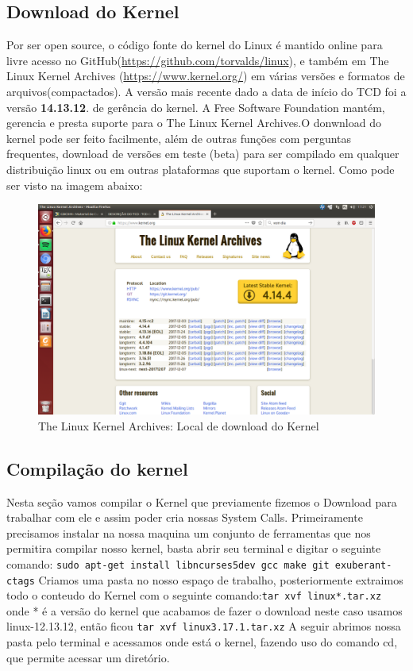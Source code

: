 \documentclass[12pt]{article}
\begin{document}
\subsection*{Download do Kernel}
Por ser open source, o código fonte do kernel do Linux é mantido online para livre acesso no GitHub(\url{https://github.com/torvalds/linux}), e também em The Linux Kernel Archives (\url{https://www.kernel.org/}) em várias versões e formatos de arquivos(compactados). A versão mais recente dado a data de início do TCD foi a versão \textbf{14.13.12}.
de gerência do kernel.
	A Free Software Foundation mantém, gerencia e presta suporte para o The Linux Kernel Archives.O donwnload do kernel pode ser feito facilmente, além de outras funções com perguntas frequentes, download de versões em teste (beta) para ser compilado em qualquer distribuição linux ou em outras plataformas que suportam o kernel.
	\vspace*{2cm}
	 Como pode ser visto na imagem abaixo:
\begin{figure}[!h]
	\centering
	\includegraphics[scale=0.2]{imagens/kernelorg.png}
	\caption{The Linux Kernel Archives: Local de download do Kernel}
	\label{kernelorg}
\end{figure}

\subsection*{Compilação do kernel}
	Nesta seção vamos compilar o Kernel que previamente fizemos o Download para trabalhar com ele e assim poder cria nossas System Calls.
	Primeiramente precisamos instalar na nossa maquina um conjunto de ferramentas que nos permitira compilar nosso kernel, basta abrir seu terminal e digitar o seguinte comando:\newline
	\verb!sudo apt-­get install libncurses5­dev gcc make git exuberant­ctags! 
	Criamos uma pasta no nosso espaço de trabalho, posteriormente extraimos todo o conteudo do Kernel com o seguinte comando:\newline \verb!tar xvf linux­­*.tar.xz! \newline onde * é a versão do kernel que acabamos de fazer o download neste caso usamos linux-12.13.12, então ficou\newline
	\verb!tar xvf linux­3.17.1.tar.xz!\newline
	A seguir abrimos nossa pasta pelo terminal e acessamos onde está o kernel, fazendo uso do comando cd, que permite acessar um diretório.
\end{document}
